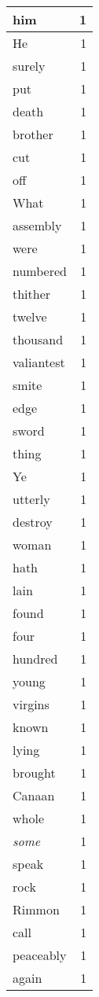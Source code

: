 \begin{center}
\begin{longtable}{l|r}
him & 1 \\ \hline
He & 1 \\ \hline
surely & 1 \\ \hline
put & 1 \\ \hline
death & 1 \\ \hline
brother & 1 \\ \hline
cut & 1 \\ \hline
off & 1 \\ \hline
What & 1 \\ \hline
assembly & 1 \\ \hline
were & 1 \\ \hline
numbered & 1 \\ \hline
thither & 1 \\ \hline
twelve & 1 \\ \hline
thousand & 1 \\ \hline
valiantest & 1 \\ \hline
smite & 1 \\ \hline
edge & 1 \\ \hline
sword & 1 \\ \hline
thing & 1 \\ \hline
Ye & 1 \\ \hline
utterly & 1 \\ \hline
destroy & 1 \\ \hline
woman & 1 \\ \hline
hath & 1 \\ \hline
lain & 1 \\ \hline
found & 1 \\ \hline
four & 1 \\ \hline
hundred & 1 \\ \hline
young & 1 \\ \hline
virgins & 1 \\ \hline
known & 1 \\ \hline
lying & 1 \\ \hline
brought & 1 \\ \hline
Canaan & 1 \\ \hline
whole & 1 \\ \hline
\emph{some} & 1 \\ \hline
speak & 1 \\ \hline
rock & 1 \\ \hline
Rimmon & 1 \\ \hline
call & 1 \\ \hline
peaceably & 1 \\ \hline
again & 1 \\ \hline

\end{longtable}
\end{center}
